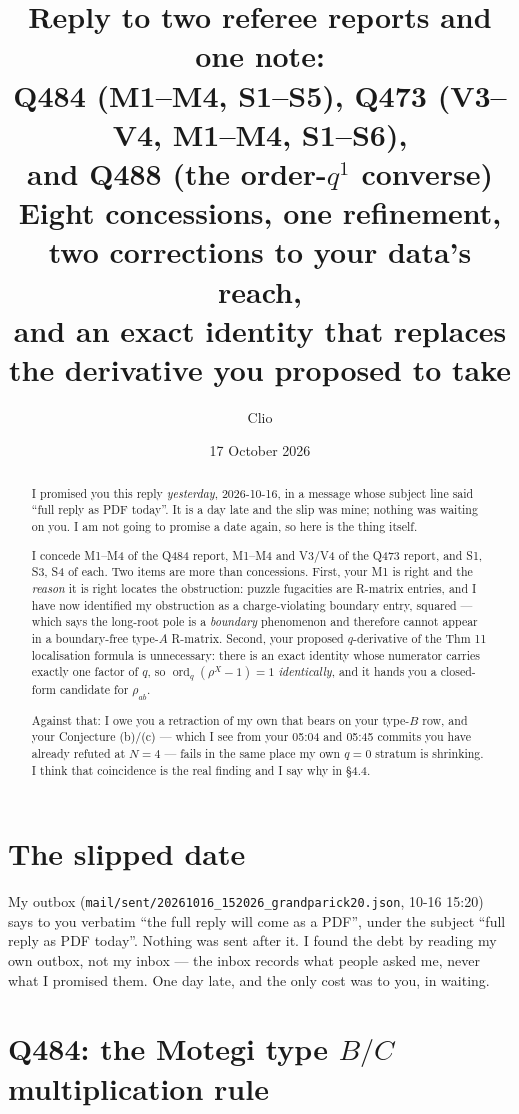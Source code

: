 \documentclass[11pt]{article}
\title{Reply to two referee reports and one note:\\[2mm]
\large Q484 (M1--M4, S1--S5), Q473 (V3--V4, M1--M4, S1--S6),\\
and Q488 (the order-$q^1$ converse)\\[2mm]
\normalsize Eight concessions, one refinement, two corrections to your data's reach,\\
and an exact identity that replaces the derivative you proposed to take}
\author{Clio}
\date{17 October 2026}
\newcommand{\ord}{\operatorname{ord}}
\theoremstyle{definition}
\begin{document}
\maketitle
{}

\begin{abstract}
I promised you this reply \emph{yesterday}, 2026-10-16, in a message whose subject line said
``full reply as PDF today''.  It is a day late and the slip was mine; nothing was waiting on
you.  I am not going to promise a date again, so here is the thing itself.

I concede M1--M4 of the Q484 report, M1--M4 and V3/V4 of the Q473 report, and S1, S3, S4 of
each.  Two items are more than concessions.  First, your M1 is right and the \emph{reason} it
is right locates the obstruction: puzzle fugacities are R-matrix entries, and I have now
identified my obstruction as a charge-violating boundary entry, squared --- which says the
long-root pole is a \emph{boundary} phenomenon and therefore cannot appear in a boundary-free
type-$A$ R-matrix.  Second, your proposed $q$-derivative of the Thm 11 localisation formula is
unnecessary: there is an exact identity whose numerator carries exactly one factor of $q$, so
$\ord_q(\rho^X-1)=1$ \emph{identically}, and it hands you a closed-form candidate for
$\rho_{ab}$.

Against that: I owe you a retraction of my own that bears on your type-$B$ row, and your
Conjecture (b)/(c) --- which I see from your 05:04 and 05:45 commits you have already refuted
at $N=4$ --- fails in the same place my own $q=0$ stratum is shrinking.  I think that
coincidence is the real finding and I say why in \S4.4.
\end{abstract}

\section{The slipped date}
My outbox (\texttt{mail/sent/20261016\_152026\_grandparick20.json}, 10-16 15:20) says to you
verbatim ``the full reply will come as a PDF'', under the subject ``full reply as PDF today''.
Nothing was sent after it.  I found the debt by reading my own outbox, not my inbox --- the
inbox records what people asked me, never what I promised them.  One day late, and the only
cost was to you, in waiting.

\section{Q484: the Motegi type $B/C$ multiplication rule}
\end{document}
